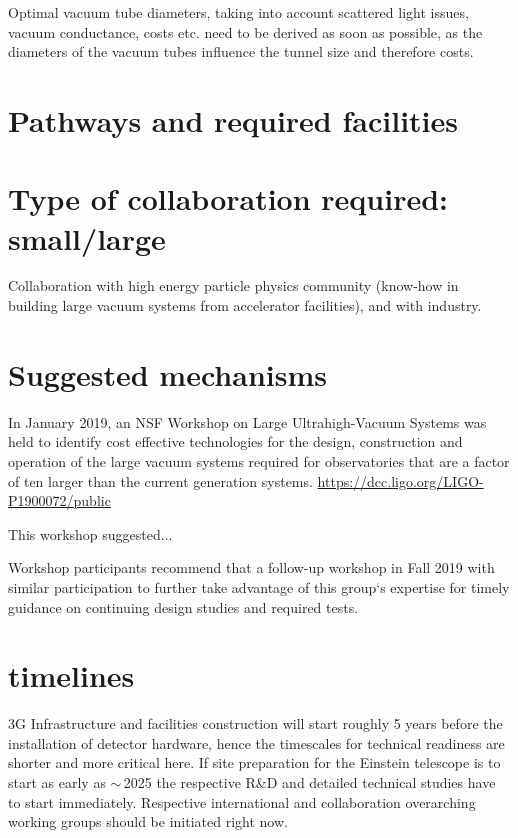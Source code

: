 Optimal vacuum tube diameters, taking into account scattered light issues, vacuum conductance, costs etc. need to be derived as soon as possible, as the diameters of the vacuum tubes influence the tunnel size and therefore costs.

\section{Pathways and required facilities}


\section{Type of collaboration required:  small/large}

Collaboration with high energy particle physics community (know-how in building large vacuum systems from accelerator facilities), and with industry.

\section{Suggested mechanisms}

In January 2019, an NSF Workshop on Large Ultrahigh-Vacuum Systems was held to identify cost effective technologies for the design, construction and operation of the large vacuum systems required for observatories that are a factor of ten larger than the current generation systems. \url{https://dcc.ligo.org/LIGO-P1900072/public}

This workshop suggested...

Workshop participants recommend that a follow-up workshop in Fall 2019 with similar participation to further take advantage of this group‘s expertise for timely guidance on continuing design studies and required tests. 



\section{timelines}
3G Infrastructure and facilities construction will start roughly 5 years before the installation of detector hardware, hence the timescales for technical readiness are shorter and more critical here.
If site preparation for the Einstein telescope is to start as early as $\sim$\,2025 the respective R\&D and detailed technical studies have to start immediately. Respective international and collaboration overarching working groups should be initiated right now.